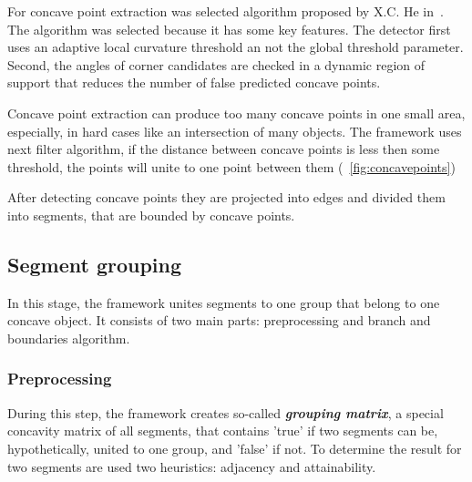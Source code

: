 \documentclass{lutmscthesis}[2010/09/22]
\begin{document}
For concave point extraction was selected algorithm proposed by X.C. He in~\cite{CSS}. The algorithm was selected because it has some key features.  The detector first uses an adaptive local curvature threshold an not the global threshold parameter. Second, the angles of corner candidates are checked in a dynamic region of support that reduces the number of false predicted concave points.

Concave point extraction can produce too many concave points in one small area, especially, in hard cases like an intersection of many objects. The framework uses next filter algorithm, if the distance between concave points is less then some threshold, the points will unite to one point between them (~\ref{fig:concavepoints})

\begin{figure}[htp]
\end{figure}
After detecting concave points they are projected into edges and divided them into segments, that are bounded by concave points.

\subsection{Segment grouping}

In this stage, the framework unites segments to one group that belong to one concave object. It consists of two main parts: preprocessing and branch and boundaries algorithm.

\subsubsection{Preprocessing} 
During this step, the framework creates so-called \textbf{\textit{grouping matrix}}, a special concavity matrix of all segments, that contains 'true' if two segments can be, hypothetically, united to one group, and 'false' if not. To determine the result for two segments are used two heuristics: adjacency and attainability.
\end{document}
